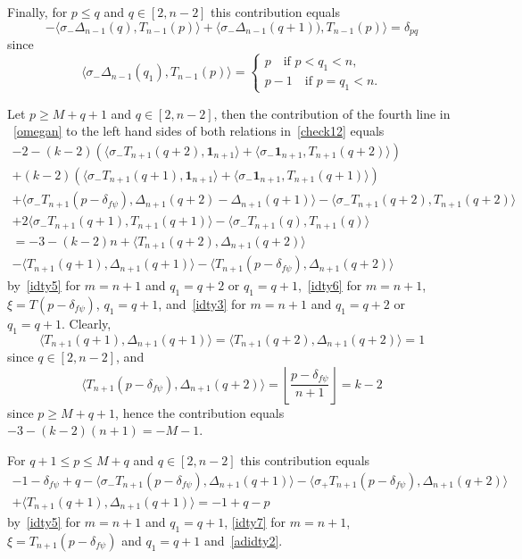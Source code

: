 \documentclass{amsart}
\theoremstyle{definition}
\theoremstyle{remark}
\numberwithin{equation}{section}
\numberwithin{theorem}{section}
\begin{document}
Finally, for $p\le q$ and $q\in [2,n-2]$ this contribution equals
\begin{equation*}
  -\langle \sigma_-\Delta_{n-1}(q),T_{n-1}(p)\rangle+
   \langle\sigma_-\Delta_{n-1}(q+1)), T_{n-1}(p)\rangle=\delta_{pq}
 \end{equation*}
since 
$$
\langle\sigma_-\Delta_{n-1}(q_1), T_{n-1}(p)\rangle=\begin{cases}
p\quad\text{if $p<q_1<n$,}\\
p-1\quad\text{if $p=q_1<n$.}
\end{cases}
$$

Let $p\ge M+q+1$ and $q\in [2,n-2]$, then the  contribution of the fourth line in ~\eqref{omegan} to the left hand 
sides of  both relations in~\eqref{check12} equals
\begin{equation*}
\begin{split} 
-2-(k-2)\left(\langle \sigma_-T_{n+1}(q+2),{\mathbf 1}_{n+1}\rangle +\langle \sigma_-{\mathbf 1}_{n+1},T_{n+1}(q+2)\rangle\right)\\
+(k-2)\left(\langle \sigma_-T_{n+1}(q+1),{\mathbf 1}_{n+1}\rangle +\langle \sigma_-{\mathbf 1}_{n+1},T_{n+1}(q+1)\rangle\right)\\
+\langle \sigma_-T_{n+1}(p-\delta_{f{{\psi}}}),\Delta_{n+1}(q+2)-\Delta_{n+1}(q+1)\rangle
-\langle\sigma_-T_{n+1}(q+2), T_{n+1}(q+2)\rangle\\ +2\langle\sigma_-T_{n+1}(q+1), T_{n+1}(q+1)\rangle
-\langle\sigma_-T_{n+1}(q), T_{n+1}(q)\rangle\\
=-3-(k-2)n + \langle T_{n+1}(q+2),\Delta_{n+1}(q+2)\rangle\\
-\langle T_{n+1}(q+1),\Delta_{n+1}(q+1)\rangle
-\langle T_{n+1}(p-\delta_{f{{\psi}}}), \Delta_{n+1}(q+2)\rangle
\end{split}
\end{equation*}
by~\eqref{idty5} for $m=n+1$ and $q_1=q+2$ or $q_1=q+1$,~\eqref{idty6}  for $m=n+1$, $\xi=T(p-\delta_{f{{\psi}}})$, $q_1=q+1$, 
and~\eqref{idty3} for $m=n+1$ and $q_1=q+2$ or $q_1=q+1$.
Clearly,
\begin{equation}\label{adidty2}
 \langle T_{n+1}(q+1),\Delta_{n+1}(q+1)\rangle=
 \langle T_{n+1}(q+2),\Delta_{n+1}(q+2)\rangle=1
\end{equation}
since $q\in [2,n-2]$, and 
$$
\langle T_{n+1}(p-\delta_{f{{\psi}}}), \Delta_{n+1}(q+2)\rangle=\left\lfloor\frac {p-\delta_{f{{\psi}}}}{n+1}\right\rfloor=k-2
$$
since $p\ge M+q+1$, hence the contribution equals $-3-(k-2)(n+1)=-M-1$.

For $q+1\le p\le M+q$ and $q\in [2,n-2]$ this contribution equals
\begin{equation*}
 \begin{split}
  -1-\delta_{f{{\psi}}}+q-\langle \sigma_-T_{n+1}(p-\delta_{f{{\psi}}}), \Delta_{n+1}(q+1)\rangle-
   \langle\sigma_+T_{n+1}(p-\delta_{f{{\psi}}}), \Delta_{n+1}(q+2)\rangle\\
   +\langle T_{n+1}(q+1), \Delta_{n+1}(q+1)\rangle=-1+q-p
 \end{split}
 \end{equation*}
by~\eqref{idty5} for $m=n+1$ and $q_1=q+1$,
\eqref{idty7} for $m=n+1$, $\xi=T_{n+1}(p-\delta_{f{{\psi}}})$ and $q_1=q+1$ and~\eqref{adidty2}.
\end{document}
